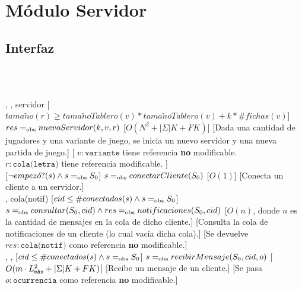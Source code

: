 \section{Módulo Servidor}
\begin{interfaz}{\subsection{Interfaz}}
  \\\\
  \par\noindent
  \begin{operaciones}
    {, , }{servidor}
    [$tama\tilde{n}o(r)\geq tama\tilde{n}oTablero(v)*tama\tilde{n}oTablero(v)+k*\#fichas(v)$]
    {$res \igobs nuevoServidor(k,v,r)$}
    [$O(N^{2}+|\Sigma|K+FK)$]
    [Dada una cantidad de jugadores y una variante de juego, se inicia un nuevo servidor y una nueva partida de juego.]
    [
    $v:\texttt{variante}$ tiene referencia \textbf{no} modificable.\\
    \-\hspace{5em}$r:\texttt{cola(letra)}$ tiene referencia modificable.
    ]\\

    \noindent{}
    {}{}
    [$\lnot empez\acute{o}?(s) \land s\igobs S_{0}$]
    {$s\igobs conectarCliente(S_{0})$}
    [$O(1)$]
    [Conecta un cliente a un servidor.]\\

    \noindent{}
    {, }{cola(notif)}
    [$cid\leq \#conectados(s) \land s\igobs S_{0}$]
    {$s\igobs consultar(S_{0},cid)\land res\igobs notificaciones(S_{0},cid)$}
    [$O(n)$, donde $n$ es la cantidad de mensajes en la cola de dicho cliente.]
    [Consulta la cola de notificaciones de un cliente (lo cual vacía dicha cola).]
    [Se devuelve $res:\texttt{cola(notif)}$ como referencia \textbf{no} modificable.]\\

    \noindent{}
    {, , }{}
    [$cid\leq \#conectados(s) \land s\igobs S_{0}$]
    {$s\igobs recibirMensaje(S_{0},cid,o)$}
    [$O(m\cdot\Lmax^{2}+|\Sigma|K+FK)$]
    [Recibe un mensaje de un cliente.]
    [Se pasa $o:\texttt{ocurrencia}$ como referencia \textbf{no} modificable.]\\


\end{operaciones}
\end{interfaz}
